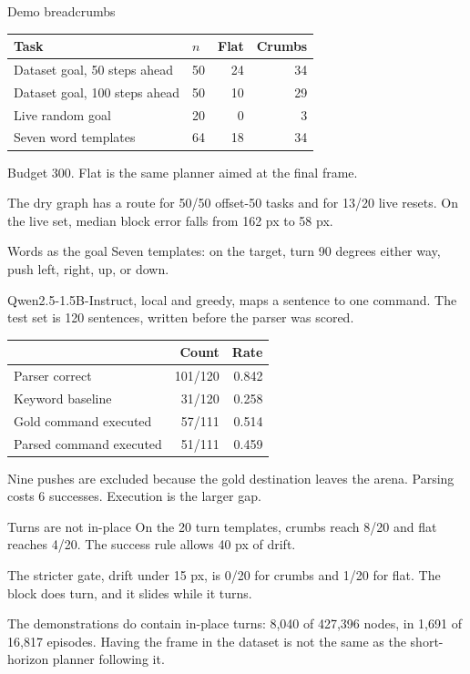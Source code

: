\documentclass[aspectratio=169,11pt]{beamer}
\begin{document}
\begin{frame}{Demo breadcrumbs}
  \begin{center}
  \small
  \begin{tabular}{llrr}
    \toprule
    Task & $n$ & Flat & Crumbs \\
    \midrule
    Dataset goal, 50 steps ahead & 50 & 24 & 34 \\
    Dataset goal, 100 steps ahead & 50 & 10 & 29 \\
    Live random goal & 20 & 0 & 3 \\
    Seven word templates & 64 & 18 & 34 \\
    \bottomrule
  \end{tabular}
  \end{center}

  Budget 300. Flat is the same planner aimed at the final frame.

  The dry graph has a route for 50/50 offset-50 tasks and for 13/20 live resets.
  On the live set, median block error falls from 162 px to 58 px.
\end{frame}

\begin{frame}{Words as the goal}
  Seven templates: on the target, turn 90 degrees either way, push left, right, up, or down.

  Qwen2.5-1.5B-Instruct, local and greedy, maps a sentence to one command.
  The test set is 120 sentences, written before the parser was scored.

  \begin{center}
  \small
  \begin{tabular}{lrr}
    \toprule
    & Count & Rate \\
    \midrule
    Parser correct & 101/120 & 0.842 \\
    Keyword baseline & 31/120 & 0.258 \\
    Gold command executed & 57/111 & 0.514 \\
    Parsed command executed & 51/111 & 0.459 \\
    \bottomrule
  \end{tabular}
  \end{center}

  Nine pushes are excluded because the gold destination leaves the arena.
  Parsing costs 6 successes. Execution is the larger gap.
\end{frame}

\begin{frame}{Turns are not in-place}
  On the 20 turn templates, crumbs reach 8/20 and flat reaches 4/20.
  The success rule allows 40 px of drift.

  The stricter gate, drift under 15 px, is 0/20 for crumbs and 1/20 for flat.
  The block does turn, and it slides while it turns.

  The demonstrations do contain in-place turns: 8,040 of 427,396 nodes, in 1,691 of 16,817 episodes.
  Having the frame in the dataset is not the same as the short-horizon planner following it.
\end{frame}
\end{document}
